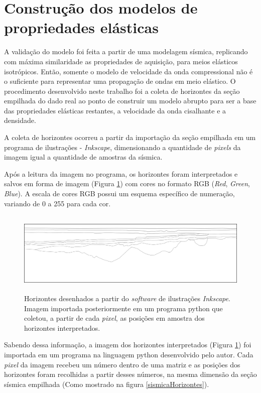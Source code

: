 \documentclass[
	12pt,				%
	openright,			%
	oneside,			%
	a4paper,			%
	english,			%
	brazil				%
	]{abntex2}
\begin{document}
\section{Construção dos modelos de propriedades elásticas}
	
	A validação do modelo foi feita a partir de uma modelagem sísmica, replicando com máxima similaridade as propriedades de aquisição, para meios elásticos isotrópicos. Então, somente o modelo de velocidade da onda compressional não é o suficiente para representar uma propagação de ondas em meio elástico. O procedimento desenvolvido neste trabalho foi a coleta de horizontes da seção empilhada do dado real ao ponto de construir um modelo abrupto para ser a base das propriedades elásticas restantes, a velocidade da onda cisalhante e a densidade.
	
	A coleta de horizontes ocorreu a partir da importação da seção empilhada em um programa de ilustrações - \textit{Inkscape}, dimensionando a quantidade de \textit{pixels} da imagem igual a quantidade de amostras da sísmica. 
	
	\newpage
	Após a leitura da imagem no programa, os horizontes foram interpretados e salvos em forma de imagem (Figura \ref{desenhoHorizontes}) com cores no formato RGB (\textit{Red}, \textit{Green}, \textit{Blue}). A escala de cores RGB possui um esquema específico de numeração, variando de 0 a 255 para cada cor. 
	
    \begin{figure}[htp!]
		\centering
		\includegraphics[width=16cm,height=4cm]{../imagens/horizontes.png}
		\caption{Horizontes desenhados a partir do \textit{software} de ilustrações \textit{Inkscape}. Imagem importada posteriormente em um programa python que coletou, a partir de cada \textit{pixel}, as posições em amostra dos horizontes interpretados.}
		\label{desenhoHorizontes}
	\end{figure}
	
	Sabendo dessa informação, a imagem dos horizontes interpretados (Figura \ref{desenhoHorizontes}) foi importada em um programa na linguagem python desenvolvido pelo autor. Cada \textit{pixel} da imagem recebeu um número dentro de uma matriz e as posições dos horizontes foram recolhidas a partir desses números, na mesma dimensão da seção sísmica empilhada (Como mostrado na figura \ref{sismicaHorizontes}).     
	
\end{document}
